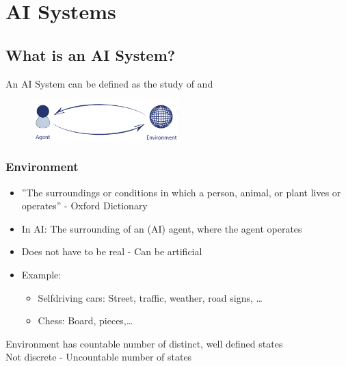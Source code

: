 \documentclass[
../../EiKI_Summary.tex,
]
{subfiles}
\begin{document}
\section{AI Systems}
\subsection{What is an AI System?}

\begin{defbox*}
    An AI System can be defined as the study of  and 
\end{defbox*}

\begin{figure}
    [htp]
    \centering
    \includegraphics[width=0.5\textwidth]{Pics/02/Agent_Environment.png}
\end{figure}

\subsubsection{Environment}
\begin{itemize}
    \item ''The surroundings or conditions in which a person, animal, or plant lives or operates'' - Oxford Dictionary
    \item In AI: The surrounding of an (AI) agent, where the agent operates
    \item Does not have to be real - Can be artificial
    \item Example: 
    \begin{itemize}
        \item Selfdriving cars: Street, traffic, weather, road signs, \dots
        \item Chess: Board, pieces,\dots
    \end{itemize}
\end{itemize}


\begin{defbox}
     Environment has countable number of distinct, well defined states\\
     Not discrete - Uncountable number of states
\end{defbox}
\end{document}
